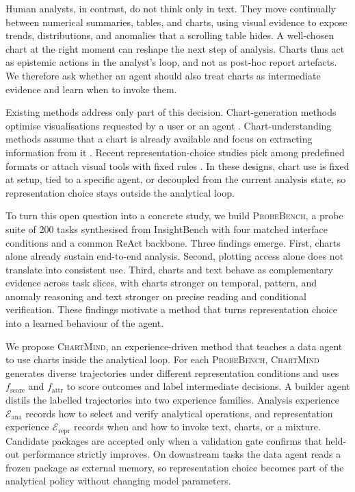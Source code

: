 \documentclass{article}
\newcommand{\method}{\textsc{ChartMind}\xspace}
\newcommand{\probe}{\textsc{ProbeBench}\xspace}
\begin{document}
\noindent Human analysts, in contrast, do not think only in text. They move continually between numerical summaries, tables, and charts, using visual evidence to expose trends, distributions, and anomalies that a scrolling table hides. A well-chosen chart at the right moment can reshape the next step of analysis. Charts thus act as epistemic actions in the analyst's loop, and not as post-hoc report artefacts. We therefore ask whether an agent should also treat charts as intermediate evidence and learn when to invoke them.

\noindent Existing methods address only part of this decision. Chart-generation methods optimise visualisations requested by a user or an agent \citep{dibia2023lida,yang2024matplotagent,yang2025chartmimic,namgoong2025amace,lu2026multivisagent,wang2025chartoptimiser}. Chart-understanding methods assume that a chart is already available and focus on extracting information from it \citep{masry2023unichart,han2023chartllama,xu2023chartbench,liu2023deplot,liu2023matcha,zhang2024tinychart}. Recent representation-choice studies pick among predefined formats or attach visual tools with fixed rules \citep{kaur2026chartagent,das2025chartsofthought,zhou2025fres,ho2026formatmatters,xing2026tabledart,lin2026evidfuse}. In these designs, chart use is fixed at setup, tied to a specific agent, or decoupled from the current analysis state, so representation choice stays outside the analytical loop.

\noindent To turn this open question into a concrete study, we build \probe{}, a probe suite of 200 tasks synthesised from InsightBench \citep{sahu2025insightbench} with four matched interface conditions and a common ReAct backbone. Three findings emerge. First, charts alone already sustain end-to-end analysis. Second, plotting access alone does not translate into consistent use. Third, charts and text behave as complementary evidence across task slices, with charts stronger on temporal, pattern, and anomaly reasoning and text stronger on precise reading and conditional verification. These findings motivate a method that turns representation choice into a learned behaviour of the agent.

\noindent We propose \method{}, an experience-driven method that teaches a data agent to use charts inside the analytical loop. For each \probe{}, \method{} generates diverse trajectories under different representation conditions and uses $f_{\mathrm{score}}$ and $f_{\mathrm{attr}}$ to score outcomes and label intermediate decisions. A builder agent distils the labelled trajectories into two experience families. Analysis experience $\mathcal{E}_{\mathrm{ana}}$ records how to select and verify analytical operations, and representation experience $\mathcal{E}_{\mathrm{repr}}$ records when and how to invoke text, charts, or a mixture. Candidate packages are accepted only when a validation gate confirms that held-out performance strictly improves. On downstream tasks the data agent reads a frozen package as external memory, so representation choice becomes part of the analytical policy without changing model parameters.
\end{document}
